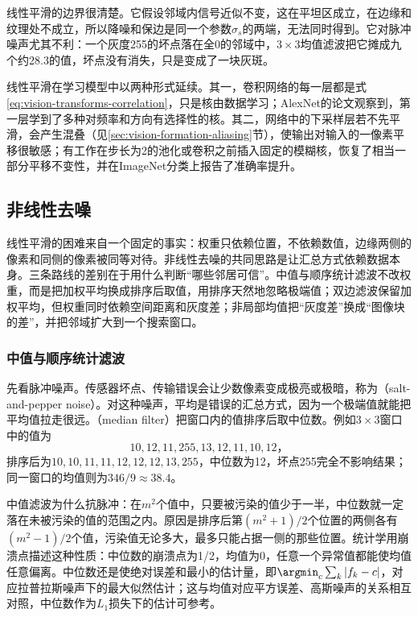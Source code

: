 线性平滑的边界很清楚。它假设邻域内信号近似不变，这在平坦区成立，在边缘和纹理处不成立，所以降噪和保边是同一个参数$\sigma_s$的两端，无法同时得到。它对脉冲噪声尤其不利：一个灰度255的坏点落在全0的邻域中，$3\times3$均值滤波把它摊成九个约28.3的值，坏点没有消失，只是变成了一块灰斑。

线性平滑在学习模型中以两种形式延续。其一，卷积网络的每一层都是式\eqref{eq:vision-transforms-correlation}，只是核由数据学习；AlexNet的论文观察到，第一层学到了多种对频率和方向有选择性的核。其二，网络中的下采样层若不先平滑，会产生混叠（见\ref{sec:vision-formation-aliasing}节），使输出对输入的一像素平移很敏感；有工作在步长为2的池化或卷积之前插入固定的模糊核，恢复了相当一部分平移不变性，并在ImageNet分类上报告了准确率提升。

\subsection{非线性去噪}
\label{sec:vision-transforms-nonlinear-denoising}

线性平滑的困难来自一个固定的事实：权重只依赖位置，不依赖数值，边缘两侧的像素和同侧的像素被同等对待。非线性去噪的共同思路是让汇总方式依赖数据本身。三条路线的差别在于用什么判断“哪些邻居可信”。中值与顺序统计滤波不改权重，而是把加权平均换成排序后取值，用排序天然地忽略极端值；双边滤波保留加权平均，但权重同时依赖空间距离和灰度差；非局部均值把“灰度差”换成“图像块的差”，并把邻域扩大到一个搜索窗口。

\subsubsection{中值与顺序统计滤波}

先看脉冲噪声。传感器坏点、传输错误会让少数像素变成极亮或极暗，称为（salt-and-pepper noise）。对这种噪声，平均是错误的汇总方式，因为一个极端值就能把平均值拉走很远。（median filter）把窗口内的值排序后取中位数。例如$3\times3$窗口中的值为
\[
  10,12,11,255,13,12,11,10,12\text{，}
\]
排序后为$10,10,11,11,12,12,12,13,255$，中位数为12，坏点255完全不影响结果；同一窗口的均值则为$346/9\approx38.4$。

中值滤波为什么抗脉冲：在$m^2$个值中，只要被污染的值少于一半，中位数就一定落在未被污染的值的范围之内。原因是排序后第$(m^2+1)/2$个位置的两侧各有$(m^2-1)/2$个值，污染值无论多大，最多只能占据一侧的那些位置。统计学用崩溃点描述这种性质：中位数的崩溃点为1/2，均值为0，任意一个异常值都能使均值任意偏离。中位数还是使绝对误差和最小的估计量，即$\argmin_c\sum_k|f_k-c|$，对应拉普拉斯噪声下的最大似然估计；这与均值对应平方误差、高斯噪声的关系相互对照，中位数作为$L_1$损失下的估计可参考。

